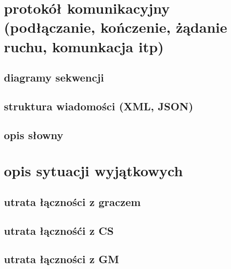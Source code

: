 \documentclass[a4paper]{article}
\begin{document}
\section{ protokół komunikacyjny (podłączanie, kończenie, żądanie ruchu, komunkacja itp)}

\subsection{diagramy sekwencji}
\subsection{struktura wiadomości (XML, JSON)}
\subsection{opis słowny}

\section{opis sytuacji wyjątkowych}
\subsection{utrata łączności z graczem}
\subsection{utrata łącznośći z CS}
\subsection{utrata łączności z GM}
  
\end{document}
